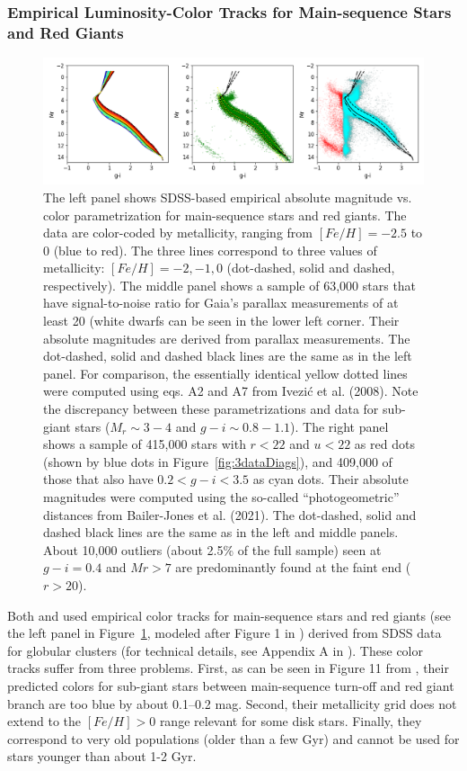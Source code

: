 \subsubsection{Empirical Luminosity-Color Tracks for Main-sequence Stars and Red Giants}

\begin{figure}[b!]
\includegraphics[width=1.0\textwidth,angle=0]{figures/plot3HRdiags.png}  
\caption{The left panel shows SDSS-based empirical absolute magnitude vs. color parametrization for main-sequence stars and red giants.
The data are color-coded by metallicity, ranging from $[Fe/H] = -2.5$ to 0 (blue to red). The three lines correspond to three values of
metallicity: $[Fe/H] = -2, -1, 0$ (dot-dashed, solid and dashed, respectively). The middle panel shows a sample of 63,000 stars that have
signal-to-noise ratio for Gaia’s parallax measurements of at least 20 (white dwarfs can be seen in the lower left corner.
Their absolute magnitudes are derived from parallax measurements. The dot-dashed,
solid and dashed black lines are the same as in the left panel. For comparison, the essentially identical yellow dotted lines were computed
using eqs. A2 and A7 from Ivezi\'{c} et al. (2008).  Note the discrepancy between these parametrizations and data for sub-giant stars ($M_r \sim 3-4$
and $g-i \sim 0.8-1.1$). The right panel shows a sample of 415,000 stars with $r < 22$ and $u<22$ as red dots (shown by blue dots in
Figure~\ref{fig:3dataDiags}), and 409,000 of those that also have  $0.2 < g-i < 3.5$ as cyan dots. Their absolute magnitudes were computed
using the so-called “photogeometric” distances from Bailer-Jones et al. (2021). The dot-dashed, solid and dashed black lines are the
same as in the left and middle panels. About 10,000 outliers (about 2.5\% of the full
sample) seen at $g-i = 0.4$ and $Mr > 7$ are predominantly found at the faint end ($r>20$).}
\label{fig:3HRdiags}
\end{figure}


Both \cite{2012ApJ...757..166B} and \cite{2014ApJ...783..114G} used empirical color tracks for main-sequence stars
and red giants (see the left panel in Figure~\ref{fig:3HRdiags}, modeled after Figure 1 in \citealt{2014ApJ...783..114G})
derived from SDSS data for globular clusters (for technical details, see
Appendix A in \citealt{2008ApJ...684..287I}). These color tracks suffer from three problems. First, as can be seen in Figure 11 from
\cite{2014ApJ...783..114G}, their predicted colors for sub-giant stars between main-sequence turn-off and red giant branch are too blue by
about 0.1--0.2 mag. Second, their metallicity grid does not extend to the $[Fe/H]>0$ range relevant for some disk stars. Finally, they
correspond to very old populations (older than a few Gyr) and cannot be used for stars younger than about 1-2 Gyr. 

